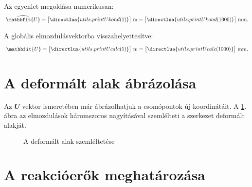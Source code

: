 \documentclass[a4paper, 12pt]{scrartcl}
\newcommand{\rvec}[1]{\mathbfit{#1}}
\newcommand{\sifigures}[1]{\sisetup{exponent-mode = fixed, round-mode=figures, round-precision=#1}}
\newcommand{\siplaces}[1]{\sisetup{exponent-mode = fixed, round-mode=places, round-precision=#1}}
\newcommand{\sisci}{\sisetup{exponent-mode = scientific}}
\begin{document}
Az egyenlet megoldása numerikusan:
\begin{equation}
  \sifigures{3} \sisci\
  \widehat{\rvec U} = \begin{bmatrix}
    \directlua{utils.printUkond(1)}
  \end{bmatrix} \, \mathrm{m}
  =
  \siplaces{2}
  \begin{bmatrix}
    \directlua{utils.printUkond(1000)}
  \end{bmatrix} \, \mathrm{mm}.
  \label{eq:numericCond}
\end{equation}

A globális elmozdulásvektorba visszahelyettesítve:
\begin{equation}
  \sifigures{3} \sisci\
  {\rvec U} = \begin{bmatrix}
    \directlua{utils.printUcalc(1)}
  \end{bmatrix} \, \mathrm{m}
  =
  \siplaces{2}
  \begin{bmatrix}
    \directlua{utils.printUcalc(1000)}
  \end{bmatrix} \, \mathrm{mm}.
  \label{eq:Ucalc}
\end{equation}




\section{A deformált alak ábrázolása} %
\label{sec:A deformált alak ábrázolása}

Az $\rvec U$ vektor ismeretében már ábrázolhatjuk a csomópontok új koordinátáit.
A \ref{fig:deformed}. ábra az elmozdulások háromszoros nagyításával szemlélteti
a szerkezet deformált alakját.

\begin{figure}[H]
  \centering
  
  \caption{A deformált alak szemléltetése}
  \label{fig:deformed}
\end{figure}




\section{A reakcióerők meghatározása} %
\label{sec:A reakcióerők meghatározása}
\end{document}

